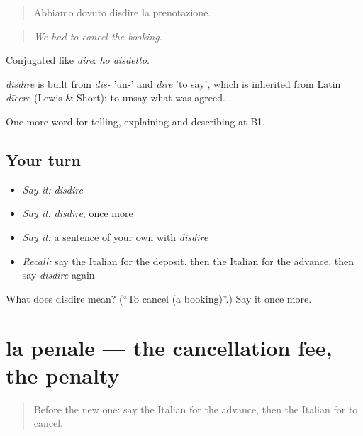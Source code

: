 \begin{quote}
Abbiamo dovuto disdire la prenotazione.
\end{quote}

\begin{quote}
\emph{We had to cancel the booking.}
\end{quote}

Conjugated like \emph{dire}: \emph{ho disdetto}.

\begin{cousinweb}
\emph{disdire} is built from \emph{dis-} 'un-' and \emph{dire} 'to say', which is inherited from Latin \emph{dīcere} (Lewis \& Short): to unsay what was agreed.
\end{cousinweb}

\begin{grammarlens}[title={What you've built}]
One more word for telling, explaining and describing at B1.
\end{grammarlens}

\subsection*{Your turn}
\begin{itemize}
\raggedright
  \item \emph{Say it:} \emph{disdire}
  \item \emph{Say it:} \emph{disdire}, once more
  \item \emph{Say it:} a sentence of your own with \emph{disdire}
  \item \emph{Recall:} say the Italian for the deposit, then the Italian for the advance, then say \emph{disdire} again
\end{itemize}

\begin{tcolorbox}[breakable,colback=teal!4,colframe=teal!35!black,title={Before you move on}]
What does disdire mean? (\textquotedblleft{}To cancel (a booking)\textquotedblright{}.) Say it once more.
\end{tcolorbox}
\section[la penale]{la penale — the cancellation fee, the penalty}

\label{lesson:IT-C431-penale}



\begin{quote}
Before the new one: say the Italian for the advance, then the Italian for to cancel.
\end{quote}


